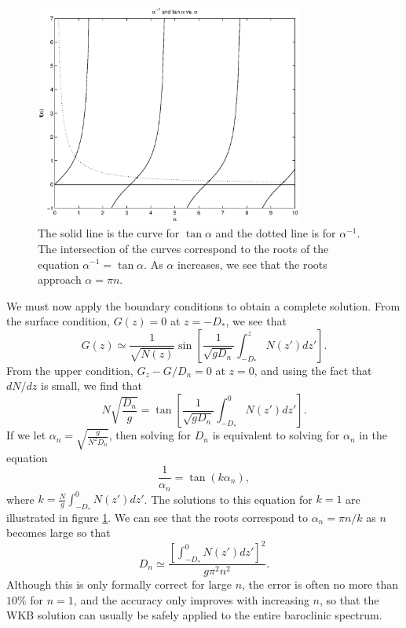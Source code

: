 \documentclass[11pt]{article}
\begin{document}
\begin{figure}[t]
\centerline{\includegraphics[width=250pt]{ModeRoots.eps}}
\caption{\footnotesize The solid line is the curve for $\tan \alpha$ and the dotted line is for $\alpha^{-1}$. The intersection of the curves correspond to the roots of the equation $\alpha^{-1} = \tan \alpha$. As $\alpha$ increases, we see that the roots approach $\alpha = \pi n$.}
\label{ModeRootsFig}
\end{figure}

We must now apply the boundary conditions to obtain a complete solution. From the surface condition, $G(z) = 0$ at $z = -D_*$, we see that
\begin{equation}
G(z) \simeq \frac{1}{\sqrt{N(z)}} \sin \left[\frac{1}{\sqrt{g D_n}} \int_{-D_*}^{z} N(z') dz' \right].
\end{equation}
From the upper condition, $G_z - G / D_n = 0$ at $z = 0$, and using the fact that $dN/dz$ is small, we find that
\begin{equation}
N \sqrt{\frac{D_n}{g}} = \tan \left[\frac{1}{\sqrt{g D_n}} \int_{-D_*}^{0} N(z') dz' \right].
\end{equation}
If we let $\alpha_n = \sqrt{\frac{g}{N^2 D_n}}$, then solving for $D_n$ is equivalent to solving for $\alpha_n$ in the equation
\begin{equation}\label{ModeRoots}
\frac{1}{\alpha_n} = \tan \left(k \alpha_n \right),
\end{equation}
where $k = \frac{N}{g} \int_{-D_*}^{0} N(z') dz'$. The solutions to this equation for $k=1$ are illustrated in figure \ref{ModeRootsFig}.
We can see that the roots correspond to $\alpha_n = \pi n / k$ as $n$ becomes large so that
\begin{equation}
D_n \simeq \frac{\left[\int_{-D_*}^{0} N(z') dz' \right]^2}{g \pi^2 n^2}.
\end{equation}
Although this is only formally correct for large $n$, the error is often no more than $10\%$ for $n=1$, and the accuracy only improves with increasing $n$, so that the WKB solution can usually be safely applied to the entire baroclinic spectrum.
\end{document}
